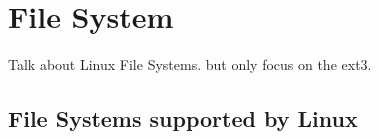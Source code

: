 \chapter{File System}
\thispagestyle{empty}

Talk about Linux File Systems. but only focus on the ext3.

\section{File Systems supported by Linux}





